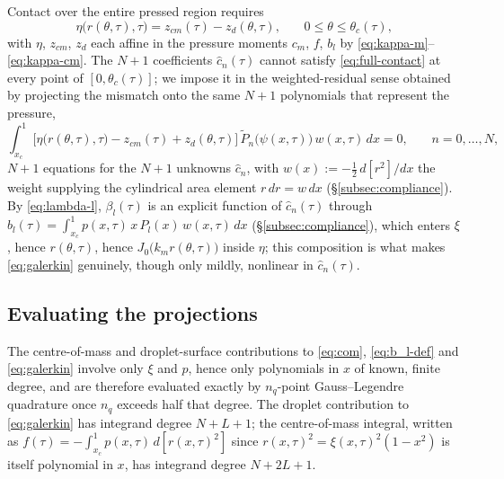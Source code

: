 Contact over the entire pressed region requires
\begin{equation}
    \eta\big(r(\theta,\tau),\tau\big) = z_{cm}(\tau) - z_d(\theta,\tau)\text{,}\qquad 0\le\theta\le\theta_c(\tau)\text{,}
    \label{eq:full-contact}
\end{equation}
with $\eta$, $z_{cm}$, $z_d$ each affine in the pressure moments $c_m$, $f$, $b_l$ by \eqref{eq:kappa-m}--\eqref{eq:kappa-cm}. The $N+1$ coefficients $\hat c_n(\tau)$ cannot satisfy \eqref{eq:full-contact} at every point of $[0,\theta_c(\tau)]$; we impose it in the weighted-residual sense obtained by projecting the mismatch onto the same $N+1$ polynomials that represent the pressure,
\begin{equation}
    \int_{x_c}^1 \Big[\eta\big(r(\theta,\tau),\tau\big) - z_{cm}(\tau) + z_d(\theta,\tau)\Big]\,\tilde P_n\big(\psi(x,\tau)\big)\, w(x,\tau)\, dx = 0\text{,}\qquad n=0,\dots,N\text{,}
    \label{eq:galerkin}
\end{equation}
$N+1$ equations for the $N+1$ unknowns $\hat c_n$, with $w(x):=-\tfrac12\,d[r^2]/dx$ the weight supplying the cylindrical area element $r\,dr=w\,dx$ (\S\ref{subsec:compliance}). By \eqref{eq:lambda-l}, $\beta_l(\tau)$ is an explicit function of $\hat c_n(\tau)$ through $b_l(\tau)=\int_{x_c}^1p(x,\tau)\,x\,P_l(x)\,w(x,\tau)\,dx$ (\S\ref{subsec:compliance}), which enters $\xi$, hence $r(\theta,\tau)$, hence $J_0\big(k_mr(\theta,\tau)\big)$ inside $\eta$; this composition is what makes \eqref{eq:galerkin} genuinely, though only mildly, nonlinear in $\hat c_n(\tau)$.

\subsection{Evaluating the projections}
\label{subsec:projections}

The centre-of-mass and droplet-surface contributions to \eqref{eq:com}, \eqref{eq:b_l-def} and \eqref{eq:galerkin} involve only $\xi$ and $p$, hence only polynomials in $x$ of known, finite degree, and are therefore evaluated exactly by $n_q$-point Gauss--Legendre quadrature once $n_q$ exceeds half that degree. The droplet contribution to \eqref{eq:galerkin} has integrand degree $N+L+1$; the centre-of-mass integral, written as $f(\tau)=-\int_{x_c}^1p(x,\tau)\,d[r(x,\tau)^2]$ since $r(x,\tau)^2=\xi(x,\tau)^2(1-x^2)$ is itself polynomial in $x$, has integrand degree $N+2L+1$.


